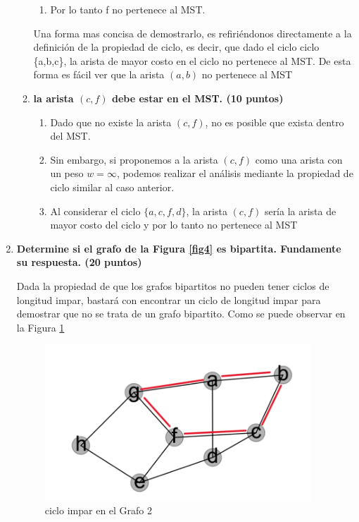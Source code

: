 \documentclass[a4paper,12pt]{article} %
\begin{document}
\begin{enumerate}
\begin{enumerate}
\begin{enumerate}
            \item Por lo tanto f no pertenece al MST.
        \end{enumerate}

        Una forma mas concisa de demostrarlo, es refiriéndonos directamente a la definición de la propiedad de ciclo, es decir, que dado el ciclo ciclo \{a,b,c\}, la arista de mayor costo en el ciclo no pertenece al MST. De esta forma es fácil ver que la arista $(a,b)$ no pertenece al MST
        
        \item \textbf{la arista $(c,f)$ debe estar en el MST. (\textbf{10 puntos})}
        \begin{enumerate}
            \item Dado que no existe la arista $(c,f)$, no es posible que exista dentro del MST.
            \item Sin embargo, si proponemos a la arista $(c,f)$ como una arista con un peso $w = \infty$, podemos realizar el análisis mediante la propiedad de ciclo similar al caso anterior.
            \item Al considerar el ciclo $\{a,c,f,d\}$, la arista $(c,f)$ sería la arista de mayor costo del ciclo y por lo tanto no pertenece al MST
            
        \end{enumerate}
        
    \end{enumerate}
    
    
    \item \textbf{Determine si el grafo de la Figura \ref{fig4} es bipartita. Fundamente su respuesta. (\textbf{20 puntos})}

    Dada la propiedad de que los grafos bipartitos no pueden tener ciclos de longitud impar, bastará con encontrar un ciclo de longitud impar para demostrar que no se trata de un grafo bipartito. 
    Como se puede observar en la Figura \ref{fig5}

    \begin{figure}[H]
    \centering
    \includegraphics[width=10cm]{grafo_impart.png}
    \caption{ciclo impar en el Grafo 2 }
    \label{fig5}
\end{figure}


\end{enumerate}
\end{document}
